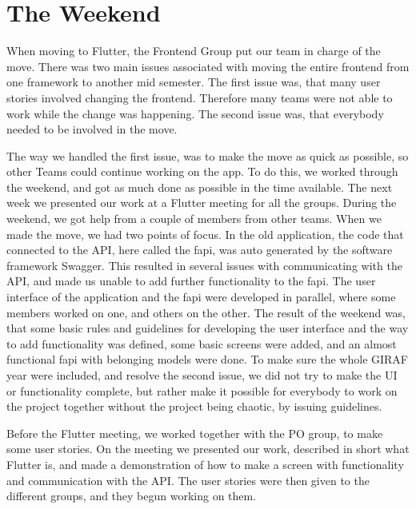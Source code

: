 \section{The Weekend}
When moving to Flutter, the Frontend Group put our team in charge of the move. 
There was two main issues associated with moving the entire frontend from one framework to another mid semester.
The first issue was, that many user stories involved changing the frontend. Therefore many teams were not able to work while the change was happening.
The second issue was, that everybody needed to be involved in the move. 

The way we handled the first issue, was to make the move as quick as possible, so other Teams could continue working on the app. 
To do this, we worked through the weekend, and got as much done as possible in the time available. The next week we presented our work at a Flutter meeting for all the groups. 
During the weekend, we got help from a couple of members from other teams. 
When we made the move, we had two points of focus. In the old application, the code that connected to the API, here called the \gls{fapi}, was auto generated by the software framework Swagger.
This resulted in several issues with communicating with the API, and made us unable to add further functionality to the \gls{fapi}. 
The user interface of the application and the \gls{fapi} were developed in parallel, where some members worked on one, and others on the other. 
The result of the weekend was, that some basic rules and guidelines for developing the user interface and the way to add functionality was defined, some basic \glspl{screen} were added, and an almost functional \gls{fapi} with belonging models were done. 
To make sure the whole GIRAF year were included, and resolve the second issue, we did not try to make the UI or functionality complete, but rather make it possible for everybody to work on the project together without the project being chaotic, by issuing guidelines. 

Before the Flutter meeting, we worked together with the PO group, to make some user stories. 
On the meeting we presented our work, described in short what Flutter is, and made a demonstration of how to make a \gls{screen} with functionality and communication with the API.
The user stories were then given to the different groups, and they begun working on them. 